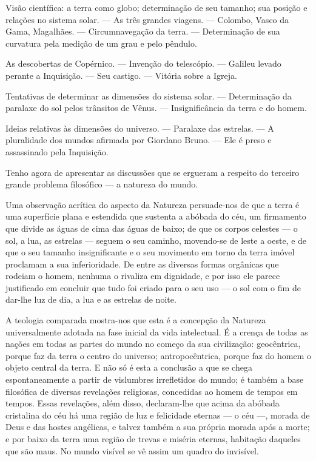 \documentclass[11pt,a5paper,twoside,openany]{book}
\begin{document}
Visão científica: a terra como globo; determinação de seu tamanho; sua posição e relações no sistema solar. — As três grandes viagens. — Colombo, Vasco da Gama, Magalhães. — Circumnavegação da terra. — Determinação de sua curvatura pela medição de um grau e pelo pêndulo.

As descobertas de Copérnico. — Invenção do telescópio. — Galileu levado perante a Inquisição. — Seu castigo. — Vitória sobre a Igreja.

Tentativas de determinar as dimensões do sistema solar. — Determinação da paralaxe do sol pelos trânsitos de Vênus. — Insignificância da terra e do homem.

Ideias relativas às dimensões do universo. — Paralaxe das estrelas. — A pluralidade dos mundos afirmada por Giordano Bruno. — Ele é preso e assassinado pela Inquisição.

Tenho agora de apresentar as discussões que se ergueram a respeito do terceiro grande problema filosófico — a natureza do mundo.

Uma observação acrítica do aspecto da Natureza persuade-nos de que a terra é uma superfície plana e estendida que sustenta a abóbada do céu, um firmamento que divide as águas de cima das águas de baixo; de que os corpos celestes — o sol, a lua, as estrelas — seguem o seu caminho, movendo-se de leste a oeste, e de que o seu tamanho insignificante e o seu movimento em torno da terra imóvel proclamam a sua inferioridade. De entre as diversas formas orgânicas que rodeiam o homem, nenhuma o rivaliza em dignidade, e por isso ele parece justificado em concluir que tudo foi criado para o seu uso — o sol com o fim de dar-lhe luz de dia, a lua e as estrelas de noite.

A teologia comparada mostra-nos que esta é a concepção da Natureza universalmente adotada na fase inicial da vida intelectual. É a crença de todas as nações em todas as partes do mundo no começo da sua civilização: geocêntrica, porque faz da terra o centro do universo; antropocêntrica, porque faz do homem o objeto central da terra. E não só é esta a conclusão a que se chega espontaneamente a partir de vislumbres irrefletidos do mundo; é também a base filosófica de diversas revelações religiosas, concedidas ao homem de tempos em tempos. Essas revelações, além disso, declaram-lhe que acima da abóbada cristalina do céu há uma região de luz e felicidade eternas — o céu —, morada de Deus e das hostes angélicas, e talvez também a sua própria morada após a morte; e por baixo da terra uma região de trevas e miséria eternas, habitação daqueles que são maus. No mundo visível se vê assim um quadro do invisível.
\end{document}
